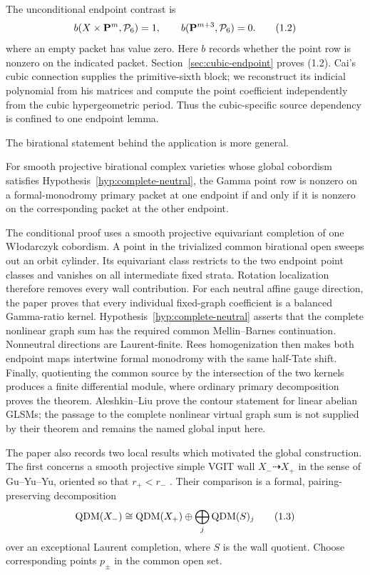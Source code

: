 The unconditional endpoint contrast is
\[
 b(X\times\mathbf P^m,\mathcal P_6)=1,
 \qquad b(\mathbf P^{m+3},\mathcal P_6)=0.                          \tag{1.2}
\]
where an empty packet has value zero.  Here \(b\) records whether the point
row is nonzero on the indicated packet.  Section~\ref{sec:cubic-endpoint}
proves (1.2).  Cai's cubic connection supplies the primitive-sixth block; we
reconstruct its indicial polynomial from his matrices and compute the point
coefficient independently from the cubic hypergeometric period.  Thus the
cubic-specific source dependency is confined to one endpoint lemma.

The birational statement behind the application is more general.

\begin{theorem}
\label{thm:intro-birational-conditional}
For smooth projective birational complex varieties whose global cobordism
satisfies Hypothesis~\ref{hyp:complete-neutral}, the Gamma point row is
nonzero on a formal-monodromy primary packet at one endpoint if and only if
it is nonzero on the corresponding packet at the other endpoint.
\end{theorem}

The conditional proof uses a smooth projective equivariant completion of one
W{\l}odarczyk cobordism.  A point in the trivialized common birational open
sweeps out an orbit
cylinder.  Its equivariant class restricts to the two endpoint point classes
and vanishes on all intermediate fixed strata.  Rotation localization
therefore removes every wall contribution.  For each neutral affine gauge
direction, the paper proves that every individual fixed-graph coefficient is
a balanced Gamma-ratio kernel.  Hypothesis~\ref{hyp:complete-neutral} asserts
that the complete nonlinear graph sum has the required common
Mellin--Barnes continuation.  Nonneutral directions are Laurent-finite.
Rees homogenization then makes both endpoint maps intertwine
formal monodromy with the same half-Tate shift.  Finally, quotienting the
common source by the intersection of the two kernels produces a finite
differential module, where ordinary primary decomposition proves the
theorem.  Aleshkin--Liu prove the contour statement for linear abelian GLSMs;
the passage to the complete nonlinear virtual graph sum is not supplied by
their theorem and remains the named global input here.

The paper also records two local results which motivated the global
construction.  The first concerns a smooth projective simple VGIT wall
\(X_-\dashrightarrow X_+\) in the sense of Gu--Yu--Yu, oriented so that
\(r_+<r_-\) \cite{GuYuYu}.  Their comparison is a formal, pairing-preserving
decomposition
\[
 \operatorname{QDM}(X_-)
 \cong \operatorname{QDM}(X_+)\oplus\bigoplus_j\operatorname{QDM}(S)_j               \tag{1.3}
\]
over an exceptional Laurent completion, where \(S\) is the wall quotient.
Choose corresponding points \(p_\pm\) in the common open set.

